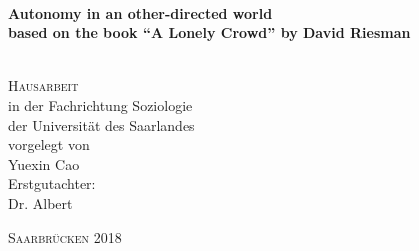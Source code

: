 \begin{titlepage}
        \thispagestyle{empty}
   \begin{adjustwidth}{-3cm}{-3cm}



\begin{center}

\vspace*{.06\textheight}

\HRule \\[0.3cm] %
{\huge \bfseries
Autonomy in an other-directed world\\
\vspace{0.2cm}
\Large based on the book ``A Lonely Crowd'' by David Riesman\par}\vspace{0.3cm} %
\HRule \\[3cm] %

\textsc{\Large Hausarbeit}\\[0.3cm] %
        {\large in der Fachrichtung Soziologie}\\
[0.3cm]
{\large der \Large Universität des Saarlandes}\\
[1.5cm]
{\normalsize vorgelegt von}\\
[0.2cm]
{\Large Yuexin Cao}\\
[1.5cm]
{\normalsize Erstgutachter:\\ Dr. Albert\\}



\vfill
{\large \scshape Saarbrücken 2018}
\end{center}
\end{adjustwidth}
\end{titlepage}